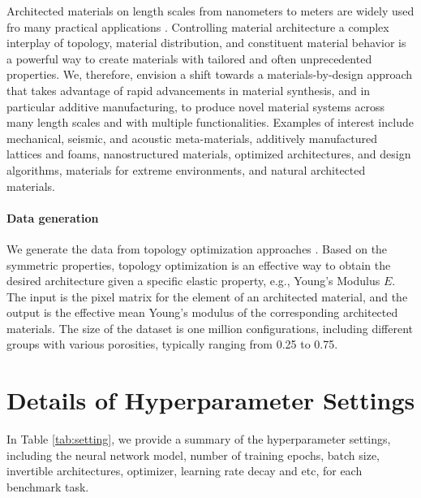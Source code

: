 \documentclass[letterpaper]{article} %
\begin{document}
Architected materials on length scales from nanometers to meters are widely used fro many practical applications \cite{mao2020designing}. Controlling material architecture a complex interplay of topology, material distribution, and constituent material behavior is a powerful way to create materials with tailored and often unprecedented properties. We, therefore, envision a shift towards a materials-by-design approach that takes advantage of rapid advancements in material synthesis, and in particular additive manufacturing, to produce novel material systems across many length scales and with multiple functionalities. Examples of interest include mechanical, seismic, and acoustic meta-materials, additively manufactured lattices and foams, nanostructured materials, optimized architectures, and design algorithms, materials for extreme environments, and natural architected materials. 

\paragraph{Data generation}
We generate the data from topology optimization approaches \cite{bendsoe2013topology}. Based on the symmetric properties, topology optimization is an effective way to obtain the desired architecture given a specific elastic property, e.g., Young's Modulus $E$. The input is the pixel matrix for the element of an architected material, and the output is the effective mean Young's modulus of the corresponding architected materials. The size of the dataset is one million configurations, including different groups with various porosities, typically ranging from 0.25 to 0.75. 



\section{Details of Hyperparameter Settings}
In Table \ref{tab:setting}, we provide a summary of the hyperparameter settings, including the neural network model, number of training epochs, batch size, invertible architectures, optimizer, learning rate decay and etc, for each benchmark task. 

\end{document}
